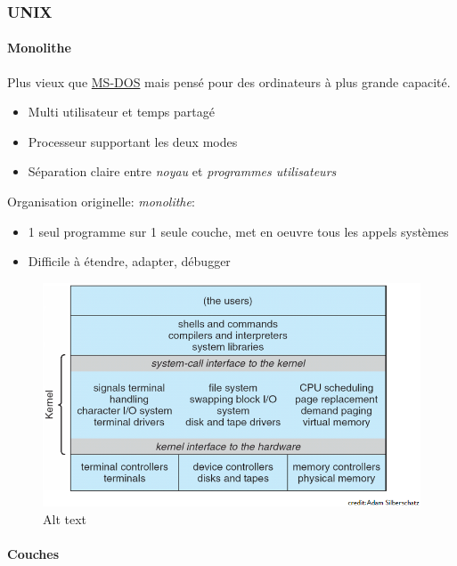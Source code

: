 \subsubsection{UNIX}\label{unix}

\paragraph{Monolithe}\label{monolithe}

Plus vieux que \hyperref[ms-dos]{MS-DOS} mais pensé pour des ordinateurs
à plus grande capacité.

\begin{itemize}
\tightlist
\item
  Multi utilisateur et temps partagé
\item
  Processeur supportant les deux modes
\item
  Séparation claire entre \emph{noyau} et \emph{programmes utilisateurs}
\end{itemize}

Organisation originelle: \emph{monolithe}:

\begin{itemize}
\tightlist
\item
  1 seul programme sur 1 seule couche, met en oeuvre tous les appels
  systèmes
\item
  Difficile à étendre, adapter, débugger
\end{itemize}

\begin{figure}
\centering
\includegraphics{image-18.png}
\caption{Alt text}
\end{figure}

\paragraph{Couches}\label{couches}

